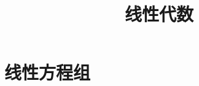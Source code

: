 \documentclass[aspectratio=169,handout]{ctexbeamer}
\title{线性代数}
\begin{document}
\setcounter{part}{2}
\part{线性方程组}

% 
% 
\end{document}
